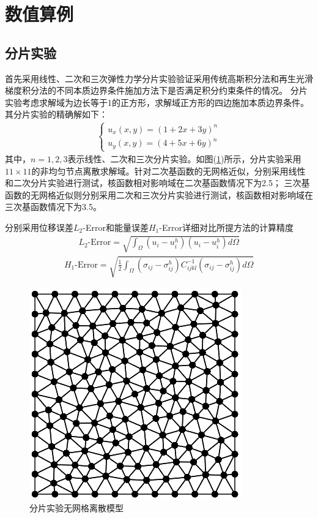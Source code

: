 \section{数值算例}
\subsection{分片实验}
首先采用线性、二次和三次弹性力学分片实验验证采用传统高斯积分法和再生光滑梯度积分法的不同本质边界条件施加方法下是否满足积分约束条件的情况。
分片实验考虑求解域为边长等于1的正方形，求解域正方形的四边施加本质边界条件。其分片实验的精确解如下：
\begin{equation}
\begin{split}
    \begin{cases}
        u_x(x,y)=(1+2x+3y)^n\\
        u_y(x,y)=(4+5x+6y)^n
    \end{cases}
\end{split}
\end{equation}
其中，$n=1,2,3$表示线性、二次和三次分片实验。如图(\ref{patchtestmeshfree})所示，分片实验采用$11\times 11$的非均匀节点离散求解域。针对二次基函数的无网格近似，分别采用线性和二次分片实验进行测试，核函数相对影响域在二次基函数情况下为2.5；
三次基函数的无网格近似则分别采用二次和三次分片实验进行测试，核函数相对影响域在三次基函数情况下为3.5。\par
分别采用位移误差$L_2$-Error和能量误差$H_1$-Error详细对比所提方法的计算精度
\begin{equation}
\begin{split}
    L_2\text{-Error}=\sqrt{\int_{\Omega}(u_i-u_i^h)(u_i-u_i^h)d\Omega}
\end{split}
\end{equation}
\begin{equation}
    \begin{split}
        H_1\text{-Error}=\sqrt{\frac{1}{2}\int_{\Omega}(\sigma_{ij}-\sigma_{ij}^h)C_{ijkl}^{-1}(\sigma_{ij}-\sigma_{ij}^h)d\Omega}
    \end{split}
    \end{equation}\par
\begin{figure}[H]
    \centering
    \includegraphics[scale=0.7]{figure/EHR/patchtestmeshfree.png}
    \caption{分片实验无网格离散模型}\label{patchtestmeshfree}
\end{figure} 
